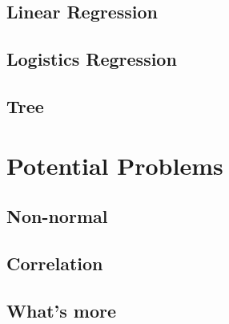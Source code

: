 \documentclass[11pt]{article}
\begin{document}
\subsection{Linear Regression}
\subsection{Logistics Regression}
\subsection{Tree}
\section{Potential Problems}
\subsection{Non-normal}
\subsection{Correlation}
\subsection{What's more}
\end{document}
